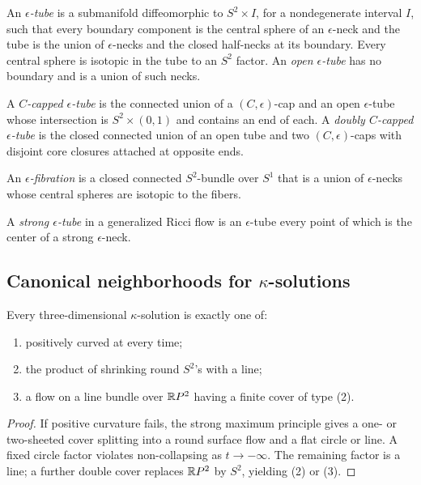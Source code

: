 \begin{definition}\label{def:epsilon-tube}
\label{epstube}

An \emph{$\epsilon$-tube} is a submanifold diffeomorphic to
$S^2\times I$, for a nondegenerate interval $I$, such that every
boundary component is the central sphere of an $\epsilon$-neck and
the tube is the union of $\epsilon$-necks and the closed half-necks
at its boundary. Every central sphere is isotopic in the tube to an
$S^2$ factor. An \emph{open $\epsilon$-tube} has no boundary and is
a union of such necks.

A \emph{$C$-capped $\epsilon$-tube} is the connected union of a
$(C,\epsilon)$-cap and an open $\epsilon$-tube whose intersection is
$S^2\times(0,1)$ and contains an end of each. A
\emph{doubly $C$-capped $\epsilon$-tube} is the closed connected
union of an open tube and two $(C,\epsilon)$-caps with disjoint core
closures attached at opposite ends.

An \emph{$\epsilon$-fibration} is a closed connected
$S^2$-bundle over $S^1$ that is a union of $\epsilon$-necks whose
central spheres are isotopic to the fibers.
\end{definition}

\begin{definition}\label{def:strong-epsilon-tube}

A \emph{strong $\epsilon$-tube} in a generalized Ricci flow is an
$\epsilon$-tube every point of which is the center of a strong
$\epsilon$-neck.
\end{definition}

\subsection{Canonical neighborhoods for $\kappa$-solutions}

\begin{proposition}\label{prop:kappa-solution-trichotomy}
\label{infprod2}

Every three-dimensional $\kappa$-solution is exactly one of:
\begin{enumerate}
\item[(1)] positively curved at every time;
\item[(2)] the product of shrinking round $S^2$'s with a line;
\item[(3)] a flow on a line bundle over $\mathbb{R} P^2$ having a finite
cover of type (2).
\end{enumerate}
\end{proposition}
\begin{proof}
\sketch If positive curvature fails, the strong maximum principle
gives a one- or two-sheeted cover splitting into a round surface
flow and a flat circle or line. A fixed circle factor violates
non-collapsing as $t\to-\infty$. The remaining factor is a line; a
further double cover replaces $\mathbb{R} P^2$ by $S^2$, yielding (2) or
(3).
\end{proof}

